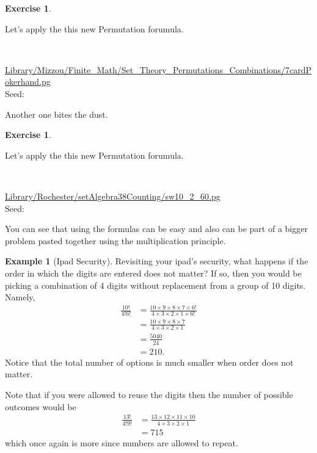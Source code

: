 \documentclass[10pt,]{book}
\theoremstyle{plain}
\theoremstyle{definition}
\theoremstyle{definition}
\newtheorem{example}[theorem]{Example}
\theoremstyle{definition}
\newtheorem{exercise}[theorem]{Exercise}
\numberwithin{equation}{section}
\begin{document}
\begin{exercise}\label{exercise-13}

		Let's apply the this new Permutation forumula.
\par\medskip
\mbox{}\\ %
\begin{mdframed}
{}\par\vspace*{2ex}%
{\tiny\ttfamily\noindent\url{Library/Mizzou/Finite_Math/Set_Theory_Permutations_Combinations/7cardPokerhand.pg}\\Seed: \hfill}\end{mdframed}
\medskip\noindent 
		Another one bites the dust.
\par
\end{exercise}
\begin{exercise}\label{exercise-14}

		Let's apply the this new Permutation forumula.
\par\medskip
\mbox{}\\ %
\begin{mdframed}
{}\par\vspace*{2ex}%
{\tiny\ttfamily\noindent\url{Library/Rochester/setAlgebra38Counting/sw10_2_60.pg}\\Seed: \hfill}\end{mdframed}
\medskip\noindent 
		You can see that using the formulas can be easy and also can be part of a bigger problem pasted together using the multiplication principle.
\par
\end{exercise}
\begin{example}[Ipad Security]\label{example-9}
Revisiting your ipad's security, what happens if the order in which the digits are entered does not matter? If so, then you would be picking a combination of 4 digits without replacement from a group of 10 digits. Namely, 
		\begin{align*}
\frac{10!}{4!6!} & = \frac{10 \times 9 \times 8 \times 7 \times 6!}{4 \times 3 \times 2 \times 1 \times 6!}\\
& = \frac{10 \times 9 \times 8 \times 7}{4 \times 3 \times 2 \times 1}\\
& = \frac{5040}{24}\\
& = 210.
\end{align*}
		Notice that the total number of options is much smaller when order does not matter.
\par

		Note that if you were allowed to reuse the digits then the number of possible outcomes would be
		\begin{align*}
\frac{13!}{4!9!} & = \frac{13 \times 12 \times 11 \times 10}{4 \times 3 \times 2 \times 1} \\
 & = 715
\end{align*}
		which once again is more since numbers are allowed to repeat.
\end{example}
\end{document}
